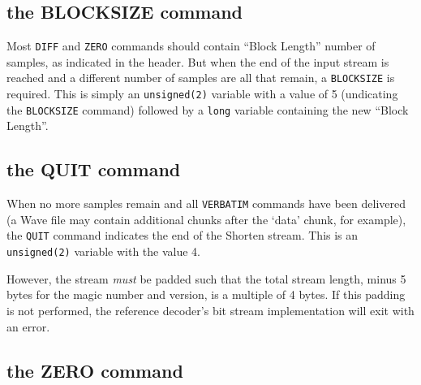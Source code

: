 \subsection{the BLOCKSIZE command}

Most \texttt{DIFF} and \texttt{ZERO} commands should contain
``Block Length'' number of samples, as indicated in the header.
But when the end of the input stream is reached and a different
number of samples are all that remain, a \texttt{BLOCKSIZE}
is required.
This is simply an \texttt{unsigned(2)} variable with a value of 5
(undicating the \texttt{BLOCKSIZE} command)
followed by a \texttt{long} variable containing the new ``Block Length''.

\subsection{the QUIT command}

When no more samples remain and all \texttt{VERBATIM} commands have
been delivered (a Wave file may contain additional chunks after
the `data' chunk, for example), the \texttt{QUIT} command indicates
the end of the Shorten stream.
This is an \texttt{unsigned(2)} variable with the value 4.

However, the stream \textit{must} be padded such that the total
stream length, minus 5 bytes for the magic number and version,
is a multiple of 4 bytes.
If this padding is not performed, the reference decoder's bit stream
implementation will exit with an error.

\subsection{the ZERO command}


